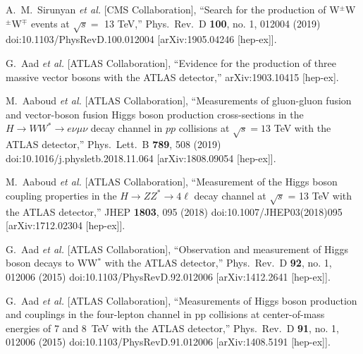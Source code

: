 \begin{thebibliography}{99}
  A.~M.~Sirunyan {\it et al.} [CMS Collaboration],
  ``Search for the production of W$^\pm$W$^\pm$W$^\mp$ events at $\sqrt{s} =$ 13 TeV,''
  Phys.\ Rev.\ D {\bf 100}, no. 1, 012004 (2019)
  doi:10.1103/PhysRevD.100.012004
  [arXiv:1905.04246 [hep-ex]].

  G.~Aad {\it et al.} [ATLAS Collaboration],
  ``Evidence for the production of three massive vector bosons with the ATLAS detector,''
  arXiv:1903.10415 [hep-ex].

  M.~Aaboud {\it et al.} [ATLAS Collaboration],
  ``Measurements of gluon-gluon fusion and vector-boson fusion Higgs boson production cross-sections in the $H \to WW^{\ast} \to e\nu\mu\nu$ decay channel in $pp$ collisions at $\sqrt{s}=13$ TeV with the ATLAS detector,''
  Phys.\ Lett.\ B {\bf 789}, 508 (2019)
  doi:10.1016/j.physletb.2018.11.064
  [arXiv:1808.09054 [hep-ex]].

  M.~Aaboud {\it et al.} [ATLAS Collaboration],
  ``Measurement of the Higgs boson coupling properties in the $H\rightarrow ZZ^{*} \rightarrow 4\ell$ decay channel at $\sqrt{s}$ = 13 TeV with the ATLAS detector,''
  JHEP {\bf 1803}, 095 (2018)
  doi:10.1007/JHEP03(2018)095
  [arXiv:1712.02304 [hep-ex]].

  G.~Aad {\it et al.} [ATLAS Collaboration],
  ``Observation and measurement of Higgs boson decays to WW$^*$ with the ATLAS detector,''
  Phys.\ Rev.\ D {\bf 92}, no. 1, 012006 (2015)
  doi:10.1103/PhysRevD.92.012006
  [arXiv:1412.2641 [hep-ex]].

  G.~Aad {\it et al.} [ATLAS Collaboration],
  ``Measurements of Higgs boson production and couplings in the four-lepton channel in pp collisions at center-of-mass energies of 7 and 8 TeV with the ATLAS detector,''
  Phys.\ Rev.\ D {\bf 91}, no. 1, 012006 (2015)
  doi:10.1103/PhysRevD.91.012006
  [arXiv:1408.5191 [hep-ex]].


\end{thebibliography}
